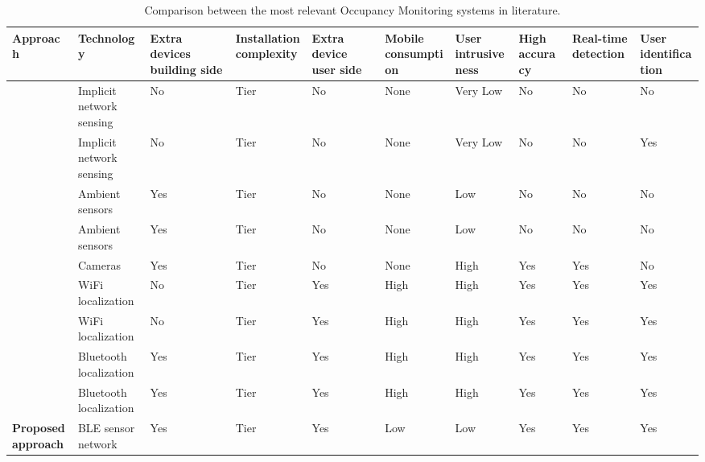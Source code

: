\begin{sidewaystable}
%
\caption[Comparison between the most relevant Occupancy Monitoring systems in literature.]{Comparison between the most relevant Occupancy Monitoring systems in literature.}
%
\label{tab:od_soa}
%
\centering
%
\renewcommand{\arraystretch}{0.65}
%
\begin{tabulary}{\textheight}{>{\bfseries}L L L L L L L L L L}
%
\toprule
%
\textbf{Approach} &
	\textbf{Technology}	& \textbf{Extra devices building side}	 & \textbf{Installation complexity}
	& \textbf{Extra device user side} & \textbf{Mobile consumption} & \textbf{User intrusiveness}
	& \textbf{High accuracy} & \textbf{Real-time detection} & \textbf{User identification}\\ 
%
\midrule
%
\cite{Melfi2011}  	& Implicit network sensing & No & Tier  & No & None & Very Low & No & No & No\\
%
\cite{Balaji2013}  	& Implicit network sensing & No & Tier  & No & None & Very Low & No & No & Yes\\
%
\midrule
%
\cite{Beltran2013}  & Ambient sensors & Yes	& Tier  & No & None & Low & No & No & No\\
%
\cite{Cossio2012}   & Ambient sensors & Yes	& Tier  & No & None & Low & No & No & No\\
%
\midrule
%
\cite{Erickson2013} & Cameras & Yes	& Tier  & No	& None & High & Yes & Yes & No\\
%
\midrule
%
\cite{Jiang2012}  	& WiFi localization	& No & Tier  & Yes & High & High & Yes & Yes & Yes\\
%
\cite{Beder2012}  	& WiFi localization	& No & Tier  & Yes & High & High & Yes & Yes & Yes\\
%
\cite{Zhu2014}  	& Bluetooth localization & Yes & Tier  & Yes & High & High & Yes & Yes & Yes\\
%
\cite{Conte2014}  	& Bluetooth localization & Yes & Tier  & Yes	& High & High & Yes & Yes & Yes\\
%
\midrule
%
Proposed approach 	& BLE sensor network & Yes & Tier  & Yes & Low & Low & Yes & Yes & Yes\\
%
\bottomrule 
%
\end{tabulary}
%
\end{sidewaystable}



\pagebreak

